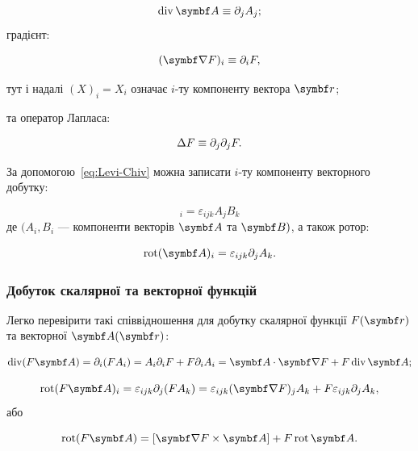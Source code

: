 \begin{equation*}
\Div \vect{A} \equiv \partial_j A_j;
\end{equation*}
%
градієнт:

\begin{equation*}
(\grad F)_i \equiv \partial_i F,
\end{equation*}

тут і надалі \((X)_i = X_i\) означає \(i\)-ту компоненту вектора \(\vect{r}\);

та оператор Лапласа:

\begin{equation*}
\Delta F \equiv \partial_j \partial_j F.
\end{equation*}



За допомогою~\eqref{eq:Levi-Chiv} можна записати \(i\)-ту компоненту векторного добутку:

\begin{equation*}
[\vect{A} \times \Bfield]_i = \varepsilon_{ijk} A_j B_k
\end{equation*}
%
де \((A_i, B_i\) --- компоненти векторів \(\vect{A}\) та \(\Bfield)\), а також ротор:

\begin{equation*}
\Rot(\vect{A})_i = \varepsilon_{ijk} \partial_j A_k.
\end{equation*}

\subsubsection{Добуток скалярної та векторної функцій}

Легко перевірити такі співвідношення для добутку скалярної функції \( F(\vect{r}) \) та векторної \( \vect{A}(\vect{r}) \):

\begin{equation*}
\Div(F \vect{A}) = \partial_i (F A_i) = A_i \partial_i F + F \partial_i A_i = \vect{A} \cdot \grad F + F \Div \vect{A};
\end{equation*}

\begin{equation*}
\Rot(F \vect{A})_i = \varepsilon_{ijk} \partial_j (F A_k) = \varepsilon_{ijk} (\grad F)_j A_k + F \varepsilon_{ijk} \partial_j A_k,
\end{equation*}
%
або

\begin{equation*}
\Rot(F \vect{A}) = [\grad F \times \vect{A}] + F \Rot \vect{A}.
\end{equation*}

